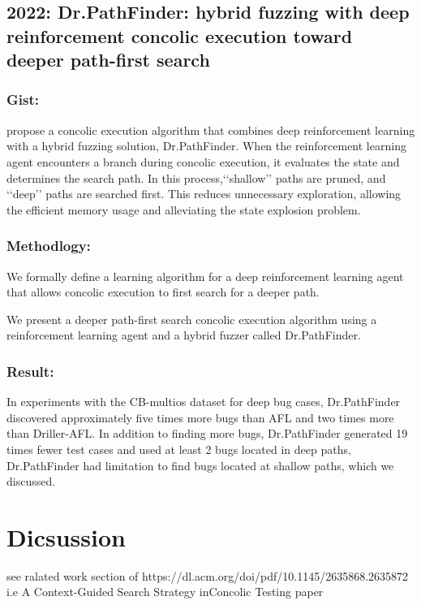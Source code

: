 \documentclass[	runningheads,
				a4paper]{llncs}
\begin{document}
\subsection{2022: Dr.PathFinder: hybrid fuzzing with deep reinforcement concolic
execution toward deeper path-first search}

\subsubsection{Gist:}
propose a concolic execution algorithm that combines deep reinforcement learning with a hybrid fuzzing
solution, Dr.PathFinder. When the reinforcement learning agent encounters a branch during concolic execution, it evaluates the state and determines the search path. In this process,‘‘shallow’’ paths are pruned, and ‘‘deep’’ paths are searched
first. This reduces unnecessary exploration, allowing the efficient memory usage and alleviating the state explosion
problem.

\subsubsection{Methodlogy:}
We formally define a learning algorithm for a deep
reinforcement learning agent that allows concolic
execution to first search for a deeper path.

We present a deeper path-first search concolic execution algorithm using a reinforcement learning agent and
a hybrid fuzzer called Dr.PathFinder.

\subsubsection{Result:}
In experiments with the CB-multios dataset for deep bug cases, Dr.PathFinder discovered approximately five
times more bugs than AFL and two times more than Driller-AFL. In addition to finding more bugs, Dr.PathFinder
generated 19 times fewer test cases and used at least 2%
bugs located in deep paths, Dr.PathFinder had limitation to find bugs located at shallow paths, which we discussed.


\section{Dicsussion}
see ralated work section of https://dl.acm.org/doi/pdf/10.1145/2635868.2635872
i.e A Context-Guided Search Strategy inConcolic Testing paper
\end{document}
